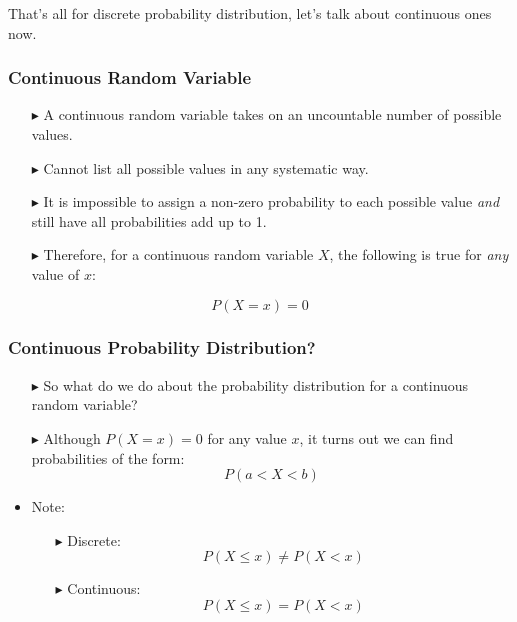 \documentclass[12pt]{beamer}
\begin{document}
 
  \begin{frame}
 	
That's all for discrete probability distribution, let's talk about continuous ones now.
 	
 \end{frame}
 \begin{frame}
 	\frametitle{Continuous Random Variable}
 	
 	\begin{itemize}
 		\item[\color{blue}$\blacktriangleright$] A continuous random variable takes on an uncountable number of possible values.
 		\item[\color{blue}$\blacktriangleright$] Cannot list all possible values in any systematic way.
 		\item[\color{blue}$\blacktriangleright$] It is impossible to assign a non-zero probability to each possible value \emph{and} still have all probabilities add up to 1.
 		\item[\color{blue}$\blacktriangleright$] Therefore, for a continuous random variable $X$, the following is true for \emph{any} value of $x$:
 	\end{itemize}
 	
 	\vspace{0.5cm}
 	
 	\[
 	P(X = x) = 0
 	\]
 	
 \end{frame}
 \begin{frame}
 	\frametitle{Continuous Probability Distribution?}
 	
 	\begin{itemize}
 		\item[\color{blue}$\blacktriangleright$] So what do we do about the probability distribution for a continuous random variable?
 		\item[\color{blue}$\blacktriangleright$] Although $P(X = x) = 0$ for any value $x$, it turns out we can find probabilities of the form:
 		\[ P(a < X < b) \]
 		\item Note:
 		\begin{itemize}
 			\item[\color{blue}$\blacktriangleright$] Discrete:
 			\[ P(X \leq x) \neq P(X < x) \]
 			\item[\color{blue}$\blacktriangleright$] Continuous:
 			\[ P(X \leq x) = P(X < x) \]
 		\end{itemize}
 	\end{itemize}
 	
 \end{frame}
 
\end{document}

